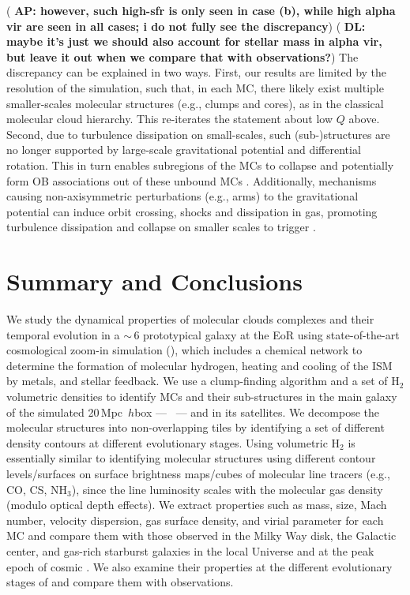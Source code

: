 \IfFileExists{emulateapjlegacy.cls}{\documentclass[iop]{emulateapjlegacy}}{\documentclass[iop]{emulateapj}}
\newcommand{\AP}[1]{({\bf \color{apcolor} AP: #1})}
\newcommand{\DL}[1]{({\bf \color{dlcolor} DL: #1})}
\begin{document}
%
\AP{however, such high-sfr is only seen in case (b), while high alpha vir are seen in all cases; i do not fully see the discrepancy} 
\DL{maybe it's just we should also account for stellar mass in alpha vir, but leave it out when we compare that with observations?}
The discrepancy can be explained in two ways. First, our results are limited by the resolution of the simulation, such that, in each MC, there likely exist multiple smaller-scales molecular structures (e.g., clumps and cores),
as in the classical molecular cloud hierarchy. This re-iterates the statement about low $Q$ above.
%
Second, due to turbulence dissipation on small-scales, such (sub-)structures are no longer supported by large-scale gravitational potential and differential rotation. This in turn enables subregions of the MCs to collapse and potentially form OB associations out of these unbound MCs \citep{Clark04a, Clark05a}.
%
Additionally, mechanisms causing non-axisymmetric perturbations (e.g., arms) to the gravitational potential can induce orbit crossing, shocks and dissipation in gas, promoting turbulence dissipation and collapse on smaller scales to trigger \SF.


\section{Summary and Conclusions}      \label{sec:conclusion}

We study the dynamical properties of molecular clouds complexes and their temporal evolution in a \z$\sim$\,6 prototypical galaxy
at the EoR using state-of-the-art cosmological zoom-in simulation (),
which includes a chemical network to determine the formation of molecular
hydrogen, heating and cooling of the ISM by metals, and stellar feedback.
We use a clump-finding algorithm and a set of H$_2$ volumetric densities
to identify MCs and their sub-structures in the main galaxy of the
simulated 20\,Mpc~$h$\pmOne box --- \flower\ --- and in its satellites.
We decompose the molecular structures into non-overlapping tiles
by identifying a set of different density contours at different evolutionary stages.
Using volumetric H$_2$ is essentially similar to identifying molecular structures using
different contour levels/surfaces on surface brightness maps/cubes of molecular line tracers (e.g., CO, CS, NH$_3$),
since the line luminosity scales with the molecular gas density (modulo optical depth effects).
We extract properties such as mass, size, Mach number, velocity dispersion, gas surface density, and virial parameter for each MC and
compare them with those observed in the Milky Way disk, the Galactic center,
and gas-rich starburst galaxies in the local Universe and at the peak epoch of cosmic \SF.
We also examine their properties at the different evolutionary stages of \flower and compare
them with observations.
\end{document}
